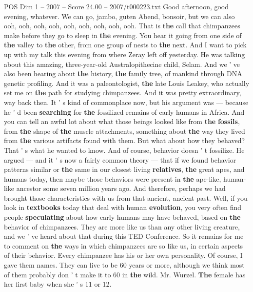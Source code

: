 \begin{textsample}{POS Dim 1 – 2007 – Score 24.00 – 2007/t000223.txt}  \label{ex:f1_pos_022}
Good afternoon, good evening, whatever.
We can go, jambo, guten Abend, bonsoir, but we can also ooh, ooh, ooh, ooh, ooh, ooh, ooh, ooh, ooh.
That is \textbf{the} call that chimpanzees make before they go to sleep in \textbf{the} evening.
You hear it going from one side of \textbf{the} valley to \textbf{the} other, from one group of nests to \textbf{the} next.
And I want to pick up with my talk this evening from where Zeray left off yesterday.
He was talking about this amazing, three-year-old Australopithecine child, Selam.
And we ' ve also been hearing about \textbf{the} history, \textbf{the} family tree, of mankind through DNA genetic profiling.
And it was a paleontologist, \textbf{the} late Louis Leakey, who actually set me on \textbf{the} path for studying chimpanzees.
And it was pretty extraordinary, way back then.
It ' s kind of commonplace now, but his argument was — because he ' d been \textbf{searching} for \textbf{the} fossilized remains of early humans in Africa.
And you can tell an awful lot about what those beings looked like from \textbf{the} \textbf{fossils}, from \textbf{the} shape of \textbf{the} muscle attachments, something about \textbf{the} way they lived from \textbf{the} various artifacts found with them.
But what about how they behaved?
That ' s what he wanted to know.
And of course, behavior doesn ' t fossilize.
He argued — and it ' s now a fairly common theory — that if we found behavior patterns similar or \textbf{the} same in our closest living \textbf{relatives}, \textbf{the} great apes, and humans today, then maybe those behaviors were present in \textbf{the} ape-like, human-like ancestor some seven million years ago.
And therefore, perhaps we had brought those characteristics with us from that ancient, ancient past.
Well, if you look in \textbf{textbooks} today that deal with human \textbf{evolution}, you very often find people \textbf{speculating} about how early humans may have behaved, based on \textbf{the} behavior of chimpanzees.
They are more like us than any other living creature, and we ' ve heard about that during this TED Conference.
So it remains for me to comment on \textbf{the} ways in which chimpanzees are so like us, in certain aspects of their behavior.
Every chimpanzee has his or her own personality.
Of course, I gave them names.
They can live to be 60 years or more, although we think most of them probably don ' t make it to 60 in \textbf{the} wild.
Mr.
Wurzel. \textbf{The} female has her first baby when she ' s 11 or 12.

\end{textsample}
